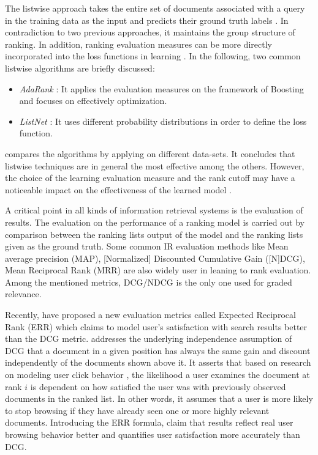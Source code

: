 The listwise approach takes the entire set of documents associated with a query in the training data as the input and predicts their ground truth labels \cite{l2r-book}. In contradiction to two previous approaches, it maintains the group structure of ranking. In addition, ranking evaluation measures can be more directly incorporated into the loss functions in learning \cite{l2r-intro}. In the following, two common listwise algorithms are briefly discussed:

\begin{itemize}
\item \textit{AdaRank} \cite{l2r-adarank}: It applies the evaluation measures on the framework of Boosting and focuses on effectively optimization.
\item \textit{ListNet} \cite{l2r-listnet}: It uses different probability distributions in order to define the loss function.
\end{itemize}

\cite{l2r-book} compares the algorithms by applying on different data-sets. It concludes that listwise techniques are in general the most effective among the others. However, the choice of the learning evaluation measure and the rank cutoff may have a noticeable impact on the effectiveness of the learned model \cite{l2r-when}.

A critical point in all kinds of information retrieval systems is the evaluation of results. The evaluation on the performance of a ranking model is carried out by comparison between the ranking lists output of the model and the ranking lists given as the ground truth. Some common IR evaluation methods like Mean average precision (MAP), [Normalized] Discounted Cumulative Gain ([N]DCG), Mean Reciprocal Rank (MRR) are also widely user in leaning to rank evaluation. Among the mentioned metrics, DCG/NDCG is the only one used for graded relevance.

Recently, \cite{l2r-err} have proposed a new evaluation metrics called Expected Reciprocal Rank (ERR) which claims to model user's satisfaction with search results better than the DCG metric. \cite{l2r-err} addresses the underlying independence assumption of DCG that a document in a given position has always the same gain and discount independently of the documents shown above it. It asserts that based on research on modeling user click behavior \cite{l2r-clickmodel1,l2r-clickmodel2}, the likelihood a user examines the document at rank $i$ is dependent on how satisfied the user was with previously observed documents in the ranked list. In other words, it assumes that a user is more likely to stop browsing if they have already seen one or more highly relevant documents. Introducing the ERR formula, \cite{l2r-err} claim that results reflect real user browsing behavior better and quantifies user satisfaction more accurately than DCG.
